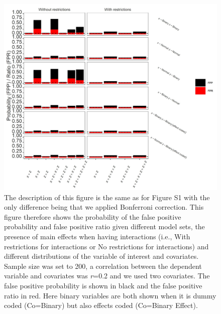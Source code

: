 \begin{figure}[hbt!]
\includegraphics[scale=0.95]{R/Analysis/Result/Figures/Figure1ASIBon.jpeg}
\centering
\caption{The description of this figure is the same as for Figure S1 with the only difference being that we applied Bonferroni correction. This figure therefore shows the probability of the false positive probability and false positive ratio given different model sets, the presence of main effects when having interactions (i.e., With restrictions for interactions or No restrictions for interactions) and different distributions of the variable of interest and covariates. Sample size was set to 200, a correlation between the dependent variable and covariates was \textit{r}=0.2 and we used two covariates. The false positive probability is shown in black and the false positive ratio in red. Here binary variables are both shown when it is dummy coded (Co=Binary) but also effects coded (Co=Binary Effect).}
\label{fig:mainfigure}
\end{figure}


